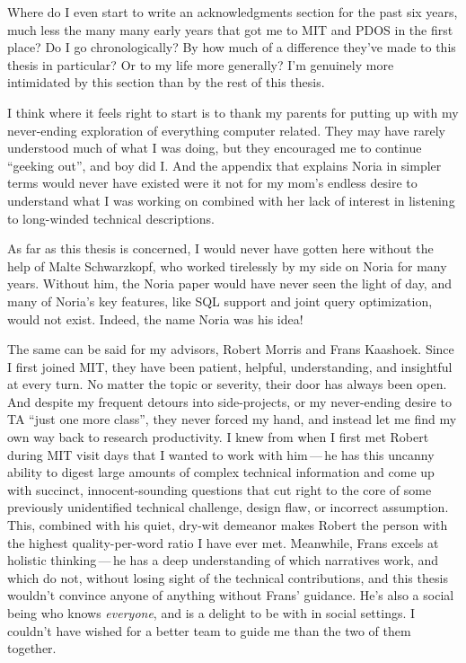 Where do I even start to write an acknowledgments section for the past six
years, much less the many many early years that got me to MIT and PDOS in the
first place? Do I go chronologically? By how much of a difference they've made
to this thesis in particular? Or to my life more generally? I'm genuinely more
intimidated by this section than by the rest of this thesis.

I think where it feels right to start is to thank my parents for putting up with
my never-ending exploration of everything computer related. They may have rarely
understood much of what I was doing, but they encouraged me to continue
``geeking out'', and boy did I. And the appendix that explains Noria in simpler
terms would never have existed were it not for my mom's endless desire to
understand what I was working on combined with her lack of interest in listening
to long-winded technical descriptions.

As far as this thesis is concerned, I would never have gotten here without the
help of Malte Schwarzkopf, who worked tirelessly by my side on Noria for many
years. Without him, the Noria paper would have never seen the light of day, and
many of Noria's key features, like SQL support and joint query optimization,
would not exist. Indeed, the name Noria was his idea!

The same can be said for my advisors, Robert Morris and Frans Kaashoek. Since I
first joined MIT, they have been patient, helpful, understanding, and insightful
at every turn. No matter the topic or severity, their door has always been open.
And despite my frequent detours into side-projects, or my never-ending desire to
TA ``just one more class'', they never forced my hand, and instead let me find
my own way back to research productivity. I knew from when I first met Robert
during MIT visit days that I wanted to work with him\,---\,he has this uncanny
ability to digest large amounts of complex technical information and come up
with succinct, innocent-sounding questions that cut right to the core of some
previously unidentified technical challenge, design flaw, or incorrect
assumption. This, combined with his quiet, dry-wit demeanor makes Robert the
person with the highest quality-per-word ratio I have ever met. Meanwhile, Frans
excels at holistic thinking\,---\,he has a deep understanding of which
narratives work, and which do not, without losing sight of the technical
contributions, and this thesis wouldn't convince anyone of anything without
Frans' guidance. He's also a social being who knows \emph{everyone}, and is a
delight to be with in social settings. I couldn't have wished for a better team
to guide me than the two of them together.

